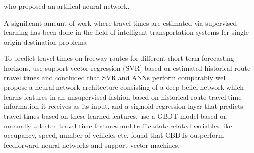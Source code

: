  
   





\cite{Chen2004_ANNKalman} who proposed an artifical neural network.


A significant amount of work where travel times are estimated via supervised learning has been done in the field of intelligent transportation systems for single origin-destination problems. 

To predict travel times on freeway routes for different short-term forecasting horizons, \cite{Vanajakshi2007} use support vector regression (SVR) based on estimated historical route travel times and concluded that SVR and ANNs perform comparably well. 
\cite{Siripanpornchana2016_AnnWithDbnFS} propose a neural network architecture consisting of a deep belief network which learns features in an unsupervised fashion based on historical route travel time information it receives as its input, and a sigmoid regression layer that predicts travel times based on these learned features. \cite{Cheng2019_GBDT} use a GBDT model based on manually selected travel time features and traffic state related variables like occupancy, speed, number of vehicles etc. \cite{Cheng2019_GBDT} found that GBDTs outperform feedforward neural networks and support vector machines.

